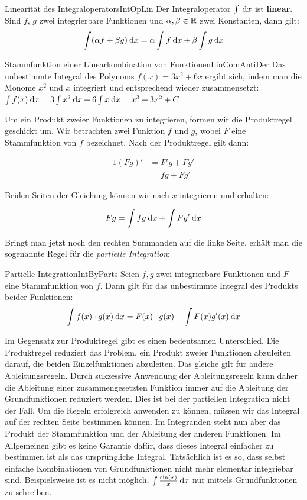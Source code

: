 \begin{statement}{Linearität des Integraloperators}{IntOpLin}
    Der Integraloperator $\int \:\mathrm{d}{x}$ ist \textbf{linear}. Sind $f$, $g$ zwei integrierbare Funktionen und $\alpha,\beta\in\mathbb{R}$ zwei Konstanten, dann gilt:
    $$
    \int (\alpha f + \beta g) \:\mathrm{d}{x} = \alpha \int f \:\mathrm{d}{x} + \beta \int g \:\mathrm{d}{x}
    $$
\end{statement}

\begin{example}{Stammfunktion einer Linearkombination von Funktionen}{LinComAntiDer}
    Das unbestimmte Integral des Polynoms $f(x) = 3x^2+6x$ ergibt sich, indem man die Monome $x^2$ und $x$ integriert und entsprechend wieder zusammensetzt: $\int f(x) \:\mathrm{d}{x} = 3 \int x^2 \:\mathrm{d}{x} + 6 \int x \:\mathrm{d}{x} = x^3 + 3 x^2 + C$.
\end{example}

Um ein Produkt zweier Funktionen zu integrieren, formen wir die Produktregel geschickt um. Wir betrachten zwei Funktion $f$ und $g$, wobei $F$ eine Stammfunktion von $f$ bezeichnet. Nach der Produktregel gilt dann:

\begin{alignat*}{1}
    (Fg)' &= F'g + Fg' \\
          &= fg + Fg'
\end{alignat*}

Beiden Seiten der Gleichung können wir nach $x$ integrieren und erhalten:

$$
  Fg = \int fg \:\mathrm{d}{x} + \int Fg' \:\mathrm{d}{x}
$$

Bringt man jetzt noch den rechten Summanden auf die linke Seite, erhält man die sogenannte Regel für die \emph{partielle Integration}:

\begin{definition}{Partielle Integration}{IntByParts}
    Seien $f,g$ zwei integrierbare Funktionen und $F$ eine Stammfunktion von $f$. Dann gilt für das unbestimmte Integral des Produkts beider Funktionen:
    $$
      \int f(x) \cdot g(x) \:\mathrm{d}{x} = F(x) \cdot g(x) - \int F(x) g'(x) \:\mathrm{d}{x}
    $$
\end{definition}

Im Gegensatz zur Produktregel gibt es einen bedeutsamen Unterschied. Die Produktregel reduziert das Problem, ein Produkt zweier Funktionen abzuleiten darauf, die beiden Einzelfunktionen abzuleiten. Das gleiche gilt für andere Ableitungsregeln. Durch sukzessive Anwendung der Ableitungsregeln kann daher die Ableitung einer zusammengesetzten Funktion immer auf die Ableitung der Grundfunktionen reduziert werden. Dies ist bei der partiellen Integration nicht der Fall. Um die Regeln erfolgreich anwenden zu können, müssen wir das Integral auf der rechten Seite bestimmen können. Im Integranden steht nun aber das Produkt der Stammfunktion und der Ableitung der anderen Funktionen. Im Allgemeinen gibt es keine Garantie dafür, dass dieses Integral einfacher zu bestimmen ist als das ursprüngliche Integral. Tatsächlich ist es so, dass selbst einfache Kombinationen von Grundfunktionen nicht mehr elementar integriebar sind. Beispielsweise ist es nicht möglich, $\int \frac{\sin(x)}{x} \:\mathrm{d}{x}$ nur mittels Grundfunktionen zu schreiben.

